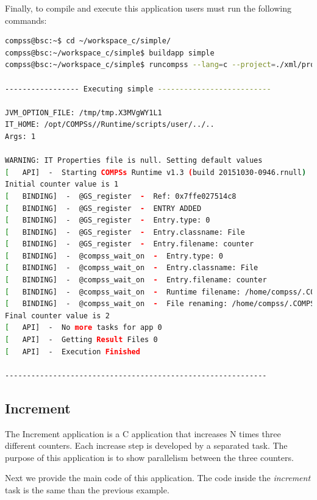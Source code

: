 Finally, to compile and execute this application users must run the following commands:

\begin{lstlisting}[language=bash]
compss@bsc:~$ cd ~/workspace_c/simple/
compss@bsc:~/workspace_c/simple$ buildapp simple
compss@bsc:~/workspace_c/simple$ runcompss --lang=c --project=./xml/project.xml --resources=./xml/resources.xml ~/workspace_c/simple/master/simple 1

----------------- Executing simple --------------------------

JVM_OPTION_FILE: /tmp/tmp.X3MVgWY1L1 
IT_HOME: /opt/COMPSs//Runtime/scripts/user/../.. 
Args: 1 

WARNING: IT Properties file is null. Setting default values
[   API]  -  Starting COMPSs Runtime v1.3 (build 20151030-0946.rnull)
Initial counter value is 1
[   BINDING]  -  @GS_register  -  Ref: 0x7ffe027514c8
[   BINDING]  -  @GS_register  -  ENTRY ADDED
[   BINDING]  -  @GS_register  -  Entry.type: 0
[   BINDING]  -  @GS_register  -  Entry.classname: File
[   BINDING]  -  @GS_register  -  Entry.filename: counter
[   BINDING]  -  @compss_wait_on  -  Entry.type: 0
[   BINDING]  -  @compss_wait_on  -  Entry.classname: File
[   BINDING]  -  @compss_wait_on  -  Entry.filename: counter
[   BINDING]  -  @compss_wait_on  -  Runtime filename: /home/compss/.COMPSs/simple_01/tmpFiles/d1v2_1446817611279.IT
[   BINDING]  -  @compss_wait_on  -  File renaming: /home/compss/.COMPSs/simple_01/tmpFiles/d1v2_1446817611279.IT to counter
Final counter value is 2
[   API]  -  No more tasks for app 0
[   API]  -  Getting Result Files 0
[   API]  -  Execution Finished

------------------------------------------------------------
\end{lstlisting}


\subsection{Increment}
The Increment application is a C application that increases N times three different counters. Each increase step is developed by a separated task. The
purpose of this application is to show parallelism between the three counters.

Next we provide the main code of this application. The code inside the \textit{increment} task is the same than the previous example. 

